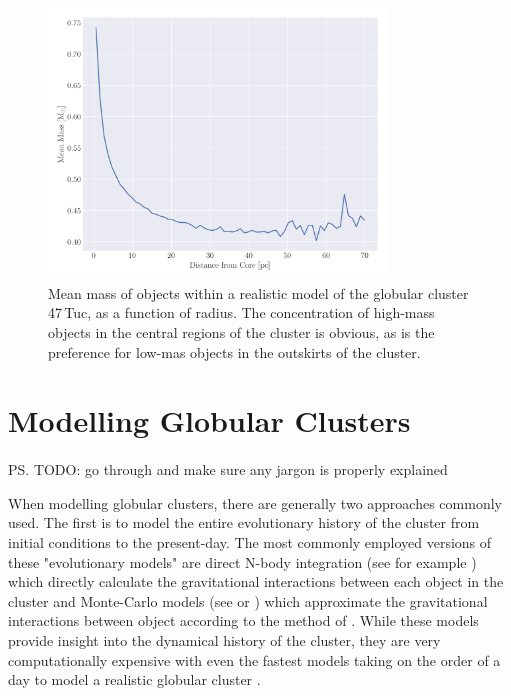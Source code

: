 \begin{figure}
	\centering
	\includegraphics[width=0.8\textwidth]{figures/radial_mean_mass.png}
	\caption{Mean mass of objects within a realistic model of the globular cluster 47\,Tuc, as a
		function of radius. The concentration of high-mass objects in the central regions of
		the cluster is obvious, as is the preference for low-mas objects in the outskirts of
		the cluster.}
	\label{fig:1/radial_mean_mass}
\end{figure}




\section{Modelling Globular Clusters}

\paragraph{}

\ps{TODO: go through and make sure any jargon is properly explained}

When modelling globular clusters, there are generally two approaches commonly used. The first is to
model the entire evolutionary history of the cluster from initial conditions to the present-day. The
most commonly employed versions of these "evolutionary models" are direct N-body integration (see
for example \citet{Baumgardt2017a}) which directly calculate the gravitational interactions between
each object in the cluster and Monte-Carlo models (see \citet{Rodriguez2021} or \cite{Hypki2013})
which approximate the gravitational interactions between object according to the method of
\citet{Henon1971}. While these models provide insight into the dynamical history of the cluster,
they are very computationally expensive with even the fastest models taking on the order of a day to
model a realistic globular cluster \citep{Rodriguez2021}.

